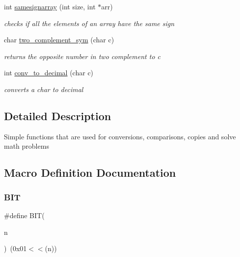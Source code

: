 \begin{DoxyCompactItemize}
int \hyperlink{group__utilities_ga75e5e4e3c99b54b12f0bb43becded2d1}{samesignarray} (int size, int $\ast$arr)
\begin{DoxyCompactList}\small\item\em checks if all the elements of an array have the same sign \end{DoxyCompactList}\item 
char \hyperlink{group__utilities_gac0df2a1416cd59f12dbc6adfd5f69ba3}{two\+\_\+complement\+\_\+sym} (char c)
\begin{DoxyCompactList}\small\item\em returns the opposite number in two complement to c \end{DoxyCompactList}\item 
int \hyperlink{group__utilities_ga79537e8684629d74571e64c633bb5303}{conv\+\_\+to\+\_\+decimal} (char c)
\begin{DoxyCompactList}\small\item\em converts a char to decimal \end{DoxyCompactList}\end{DoxyCompactItemize}


\subsection{Detailed Description}
Simple functions that are used for conversions, comparisons, copies and solve math problems 

\subsection{Macro Definition Documentation}
\hypertarget{group__utilities_ga3a8ea58898cb58fc96013383d39f482c}{}\label{group__utilities_ga3a8ea58898cb58fc96013383d39f482c} 
\subsubsection{\texorpdfstring{B\+IT}{BIT}}
{\footnotesize\ttfamily \#define B\+IT(\begin{DoxyParamCaption}\item[{}]{n }\end{DoxyParamCaption})~(0x01$<$$<$(n))}

\hypertarget{group__utilities_ga1a522aa19bcb695a9df30032a893bee3}{}\label{group__utilities_ga1a522aa19bcb695a9df30032a893bee3} 
